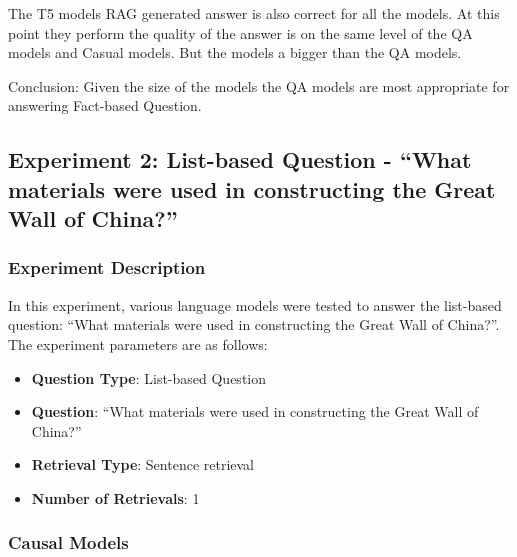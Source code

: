 \documentclass{wseas}
\begin{document}
The T5 models RAG generated answer is also correct for all the models.
At this point they perform the quality of the answer is on the same
level of the QA models and Casual models. But the models a bigger than
the QA models.

Conclusion: Given the size of the models the QA models are most
appropriate for answering Fact-based Question.


\subsection{Experiment 2: List-based Question - ``What materials were
used in constructing the Great Wall of
China?''}

\subsubsection{Experiment Description}

In this experiment, various language models were tested to answer the
list-based question: ``What materials were used in constructing the
Great Wall of China?''. The experiment parameters are as follows:

\begin{itemize}
\item
  \textbf{Question Type}: List-based Question
\item
  \textbf{Question}: ``What materials were used in constructing the
  Great Wall of China?''
\item
  \textbf{Retrieval Type}: Sentence retrieval
\item
  \textbf{Number of Retrievals}: 1
\end{itemize}

\subsubsection{Causal Models}

\end{document}
